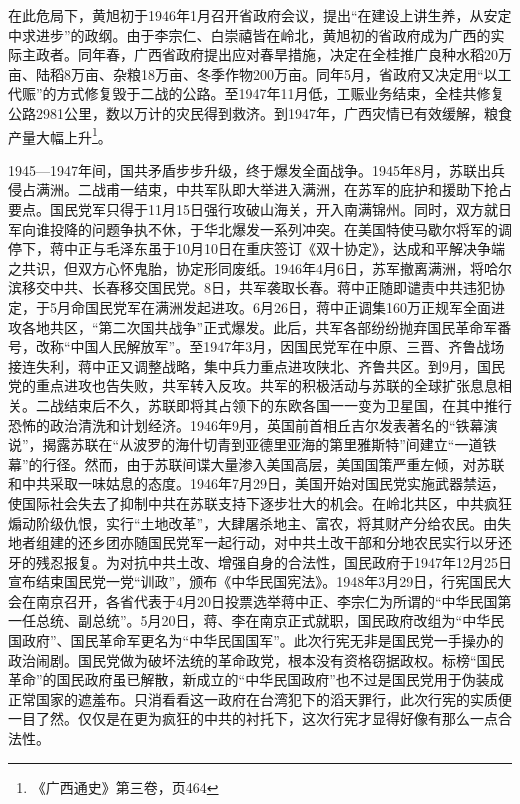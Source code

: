 在此危局下，黄旭初于1946年1月召开省政府会议，提出“在建设上讲生养，从安定中求进步”的政纲。由于李宗仁、白崇禧皆在岭北，黄旭初的省政府成为广西的实际主政者。同年春，广西省政府提出应对春旱措施，决定在全桂推广良种水稻20万亩、陆稻8万亩、杂粮18万亩、冬季作物200万亩。同年5月，省政府又决定用“以工代赈”的方式修复毁于二战的公路。至1947年11月低，工赈业务结束，全桂共修复公路2981公里，数以万计的灾民得到救济。到1947年，广西灾情已有效缓解，粮食产量大幅上升\footnote{《广西通史》第三卷，页464}。

1945—1947年间，国共矛盾步步升级，终于爆发全面战争。1945年8月，苏联出兵侵占满洲。二战甫一结束，中共军队即大举进入满洲，在苏军的庇护和援助下抢占要点。国民党军只得于11月15日强行攻破山海关，开入南满锦州。同时，双方就日军向谁投降的问题争执不休，于华北爆发一系列冲突。在美国特使马歇尔将军的调停下，蒋中正与毛泽东虽于10月10日在重庆签订《双十协定》，达成和平解决争端之共识，但双方心怀鬼胎，协定形同废纸。1946年4月6日，苏军撤离满洲，将哈尔滨移交中共、长春移交国民党。8日，共军袭取长春。蒋中正随即谴责中共违犯协定，于5月命国民党军在满洲发起进攻。6月26日，蒋中正调集160万正规军全面进攻各地共区，“第二次国共战争”正式爆发。此后，共军各部纷纷抛弃国民革命军番号，改称“中国人民解放军”。至1947年3月，因国民党军在中原、三晋、齐鲁战场接连失利，蒋中正又调整战略，集中兵力重点进攻陕北、齐鲁共区。到9月，国民党的重点进攻也告失败，共军转入反攻。共军的积极活动与苏联的全球扩张息息相关。二战结束后不久，苏联即将其占领下的东欧各国一一变为卫星国，在其中推行恐怖的政治清洗和计划经济。1946年9月，英国前首相丘吉尔发表著名的“铁幕演说”，揭露苏联在“从波罗的海什切青到亚德里亚海的第里雅斯特”间建立“一道铁幕”的行径。然而，由于苏联间谍大量渗入美国高层，美国国策严重左倾，对苏联和中共采取一味姑息的态度。1946年7月29日，美国开始对国民党实施武器禁运，使国际社会失去了抑制中共在苏联支持下逐步壮大的机会。在岭北共区，中共疯狂煽动阶级仇恨，实行“土地改革”，大肆屠杀地主、富农，将其财产分给农民。由失地者组建的还乡团亦随国民党军一起行动，对中共土改干部和分地农民实行以牙还牙的残忍报复。为对抗中共土改、增强自身的合法性，国民政府于1947年12月25日宣布结束国民党一党“训政”，颁布《中华民国宪法》。1948年3月29日，行宪国民大会在南京召开，各省代表于4月20日投票选举蒋中正、李宗仁为所谓的“中华民国第一任总统、副总统”。5月20日，蒋、李在南京正式就职，国民政府改组为“中华民国政府”、国民革命军更名为“中华民国国军”。此次行宪无非是国民党一手操办的政治闹剧。国民党做为破坏法统的革命政党，根本没有资格窃据政权。标榜“国民革命”的国民政府虽已解散，新成立的“中华民国政府”也不过是国民党用于伪装成正常国家的遮羞布。只消看看这一政府在台湾犯下的滔天罪行，此次行宪的实质便一目了然。仅仅是在更为疯狂的中共的衬托下，这次行宪才显得好像有那么一点合法性。


